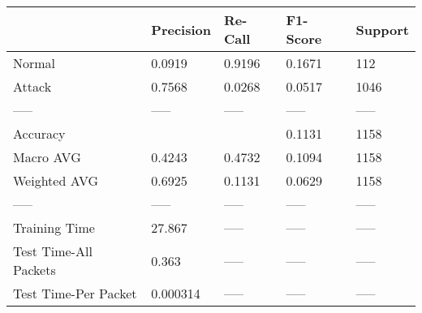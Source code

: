 \begin{tabular}{lllll}
\toprule
{} & Precision & Re-Call & F1-Score & Support \\
\midrule
Normal                &    0.0919 &  0.9196 &   0.1671 &     112 \\
Attack                &    0.7568 &  0.0268 &   0.0517 &    1046 \\
-----                 &     ----- &   ----- &    ----- &   ----- \\
Accuracy              &           &         &   0.1131 &    1158 \\
Macro AVG             &    0.4243 &  0.4732 &   0.1094 &    1158 \\
Weighted AVG          &    0.6925 &  0.1131 &   0.0629 &    1158 \\
-----                 &     ----- &   ----- &    ----- &   ----- \\
Training Time         &    27.867 &   ----- &    ----- &   ----- \\
Test Time-All Packets &     0.363 &   ----- &    ----- &   ----- \\
Test Time-Per Packet  &  0.000314 &   ----- &    ----- &   ----- \\
\bottomrule
\end{tabular}
